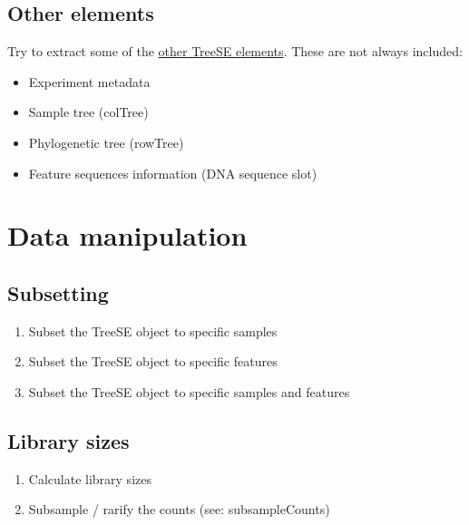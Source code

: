 \documentclass[
]{book}
\providecommand{\tightlist}{%
  \setlength{\itemsep}{0pt}\setlength{\parskip}{0pt}}
\begin{document}
\hypertarget{other-elements}{%
\subsection{Other elements}\label{other-elements}}

Try to extract some of the \href{https://f1000research.com/articles/9-1246/v2}{other TreeSE elements}. These are not always included:

\begin{itemize}
\tightlist
\item
  Experiment metadata
\item
  Sample tree (colTree)
\item
  Phylogenetic tree (rowTree)
\item
  Feature sequences information (DNA sequence slot)
\end{itemize}

\hypertarget{data-manipulation}{%
\section{Data manipulation}\label{data-manipulation}}

\hypertarget{subsetting-1}{%
\subsection{Subsetting}\label{subsetting-1}}

\begin{enumerate}
\def\labelenumi{\arabic{enumi}.}
\tightlist
\item
  Subset the TreeSE object to specific samples
\item
  Subset the TreeSE object to specific features
\item
  Subset the TreeSE object to specific samples and features
\end{enumerate}

\hypertarget{library-sizes}{%
\subsection{Library sizes}\label{library-sizes}}

\begin{enumerate}
\def\labelenumi{\arabic{enumi}.}
\tightlist
\item
  Calculate library sizes
\item
  Subsample / rarify the counts (see: subsampleCounts)
\end{enumerate}
\end{document}
